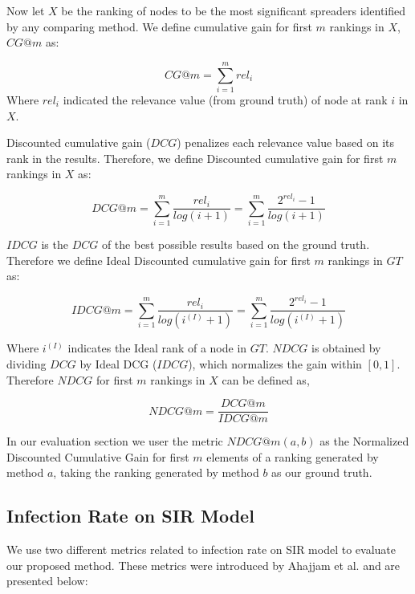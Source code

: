 \documentclass[sigconf]{acmart}
\begin{document}
Now let $X$ be the ranking of nodes to be the most significant spreaders identified by any comparing method. We define cumulative gain for first $m$ rankings in $X$, $CG@m$ as:

\begin{equation}
CG@m = \sum_{i=1}^{m} rel_i
\end{equation} 
Where $rel_i$ indicated the relevance value (from ground truth) of node at rank $i$ in $X$.

Discounted cumulative gain ($DCG$) penalizes each relevance value based on its rank in the results. Therefore, we define Discounted cumulative gain for first $m$ rankings in $X$ as:

\begin{equation}
DCG@m = \sum_{i=1}^{m} \dfrac{rel_i}{log(i+1)} = \sum_{i=1}^{m} \dfrac{2^{rel_i}-1}{log(i+1)}
\end{equation}

$IDCG$ is the $DCG$ of the best possible results based on the ground truth. Therefore we define Ideal Discounted cumulative gain for first $m$ rankings in $GT$ as:
 
\begin{equation}
IDCG@m = \sum_{i=1}^{m} \dfrac{rel_i}{log(i^{(I)}+1)} = \sum_{i=1}^{m} \dfrac{2^{rel_i}-1}{log(i^{(I)}+1)}
\end{equation}

Where $i^{(I)}$ indicates the Ideal rank of a node in $GT$. $NDCG$ is obtained by dividing $DCG$ by Ideal DCG ($IDCG$), which normalizes the gain within $[0,1]$. Therefore $NDCG$ for first  $m$ rankings in $X$ can be defined as,
	
\begin{equation}
NDCG@m = \frac{DCG@m}{IDCG@m}
\end{equation}

In our evaluation section we user the metric $NDCG@m(a,b)$ as the Normalized Discounted Cumulative Gain for first $m$ elements of a ranking generated by method $a$, taking the ranking generated by method $b$ as our ground truth.

\subsection{Infection Rate on SIR Model}
We use two different metrics related to infection rate on SIR model to evaluate our proposed method. These metrics were introduced by Ahajjam et al. \cite{ahajjam2018identification} and are presented below:
\end{document}
